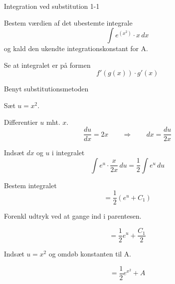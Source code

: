 \documentclass{article}
\begin{document}
\tableofcontents


\begin{exercise}{Integration ved substitution 1-1}


Bestem værdien af det ubestemte integrale
\[
\int e^{(x^2)} \cdot x \, dx
\]
og kald den ukendte integrationskonstant for A.




\hint

Se at integralet er på formen
\[
f'(g(x)) \cdot g'(x)
\]

\hint

Benyt substitutionsmetoden

\hint

Sæt $u=x^2$.


\hint

Differentier $u$ mht. $x$.
\[
\frac{du}{dx} = 2x \qquad\Rightarrow \qquad dx = \frac{du}{2x}
\]

\hint

Indsæt $dx$ og $u$ i integralet
\[
\int e^{u} \cdot \frac{x}{2x} \, du = \frac{1}{2} \int e^u \, du
\]

\hint

Bestem integralet
\[
= \frac{1}{2} \left( e^u + C_1 \right)
\]

\hint
Forenkl udtryk ved at gange ind i parentesen.

\hint

\[
= \frac{1}{2} e^u + \frac{C_1}{2}
\]

\hint

Indsæt $u = x^2$ og omdøb konstanten til A.

\hint

\[
= \frac{1}{2} e^{x^2} + A
\]


\end{exercise}

\newpage
\end{document}
